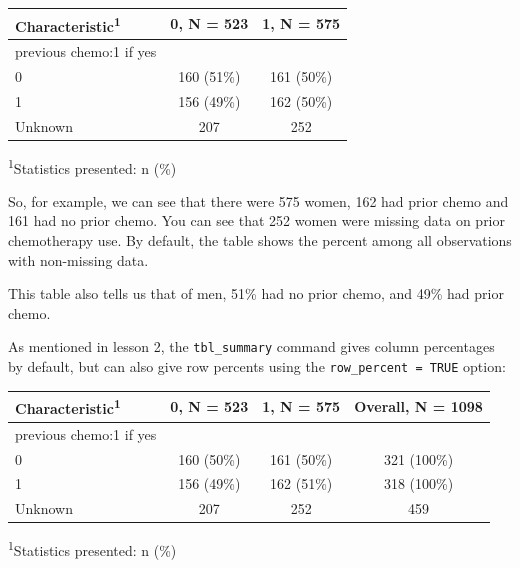 \documentclass[]{book}
\newenvironment{Shaded}{\begin{snugshade}}{\end{snugshade}}
\newcommand{\DataTypeTok}[1]{\textcolor[rgb]{0.13,0.29,0.53}{#1}}
\newcommand{\KeywordTok}[1]{\textcolor[rgb]{0.13,0.29,0.53}{\textbf{#1}}}
\newcommand{\NormalTok}[1]{#1}
\newcommand{\OperatorTok}[1]{\textcolor[rgb]{0.81,0.36,0.00}{\textbf{#1}}}
\newcommand{\OtherTok}[1]{\textcolor[rgb]{0.56,0.35,0.01}{#1}}
\newcommand{\StringTok}[1]{\textcolor[rgb]{0.31,0.60,0.02}{#1}}
\begin{document}
\captionsetup[table]{labelformat=empty,skip=1pt}
\begin{longtable}{lcc}
\toprule
\textbf{Characteristic}\textsuperscript{1} & \textbf{0}, N = 523 & \textbf{1}, N = 575 \\ 
\midrule
previous chemo:1 if yes &  &  \\ 
0 & 160 (51\%) & 161 (50\%) \\ 
1 & 156 (49\%) & 162 (50\%) \\ 
Unknown & 207 & 252 \\ 
\bottomrule
\end{longtable}
\vspace{-5mm}
\begin{minipage}{\linewidth}
\textsuperscript{1}Statistics presented: n (\%) \\ 
\end{minipage}

So, for example, we can see that there were 575 women, 162 had prior
chemo and 161 had no prior chemo. You can see that 252 women were
missing data on prior chemotherapy use. By default, the table shows the
percent among all observations with non-missing data.

This table also tells us that of men, 51\% had no prior chemo, and 49\%
had prior chemo.

As mentioned in lesson 2, the \texttt{tbl\_summary} command gives column
percentages by default, but can also give row percents using the
\texttt{row\_percent\ =\ TRUE} option:

\begin{Shaded}
\end{Shaded}

\captionsetup[table]{labelformat=empty,skip=1pt}
\begin{longtable}{lccc}
\toprule
\textbf{Characteristic}\textsuperscript{1} & \textbf{0}, N = 523 & \textbf{1}, N = 575 & \textbf{Overall}, N = 1098 \\ 
\midrule
previous chemo:1 if yes &  &  &  \\ 
0 & 160 (50\%) & 161 (50\%) & 321 (100\%) \\ 
1 & 156 (49\%) & 162 (51\%) & 318 (100\%) \\ 
Unknown & 207 & 252 & 459 \\ 
\bottomrule
\end{longtable}
\vspace{-5mm}
\begin{minipage}{\linewidth}
\textsuperscript{1}Statistics presented: n (\%) \\ 
\end{minipage}
\end{document}
